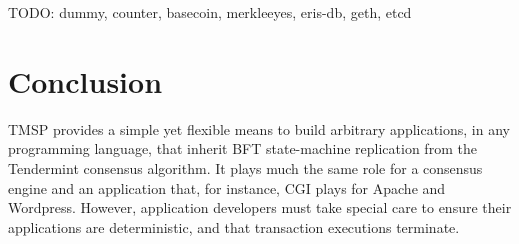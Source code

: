 TODO: dummy, counter, basecoin, merkleeyes, eris-db, geth, etcd

\section{Conclusion}

TMSP provides a simple yet flexible means to build arbitrary applications,
in any programming language,
that inherit BFT state-machine replication from the Tendermint consensus algorithm.
It plays much the same role for a consensus engine and an application that, for instance, CGI plays for Apache and Wordpress.
However, application developers must take special care to ensure their applications are deterministic, and that transaction executions terminate.

